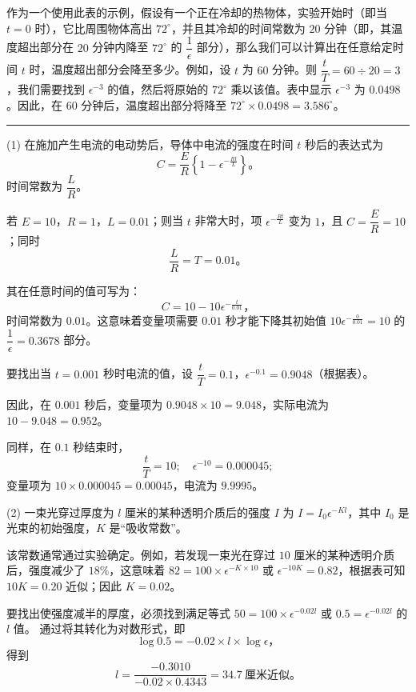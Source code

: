 \documentclass{ctexbook}
\newcommand\Subsection[1]{%
  \medskip\pagebreak[1]\par\textit{#1}\pagebreak[0]\par%
}
\newcommand{\Examples}[1]{%
  \ifthenelse{\equal{#1}{.}}{%
    \Subsection{\textit{例题}}%
  }{%
    \Subsection{\textit{#1}}%
  }
}
\newcommand{\DPPageSep}[2]{\Pagelabel{#2}}
\newcommand{\Pagelabel}[1]
  {\phantomsection\label{#1}}
\newcommand{\tb}[1][1.5in]{%
  \pagebreak[0]\par{\centering\rule{#1}{0.5pt}\pagebreak[3]\par}%
}
\newcommand{\DPtypo}[2]{#2}%
\newcommand{\DPchg}[2]{#2}%
\newcommand{\efrac}[2]{\frac{#1}{#2}}
\begin{document}
作为一个使用此表的示例，假设有一个正在冷却的热物体，实验开始时（即当 \( t = 0 \) 时），它比周围物体高出 \( 72^\circ \)，并且其冷却的时间常数为 \( 20 \) 分钟（即，其温度超出部分在 \( 20 \) 分钟内降至 \( 72^\circ \) 的 \( \dfrac{1}{\epsilon} \) 部分），那么我们可以计算出在任意给定时间 \( t \) 时，温度超出部分会降至多少。例如，设 \( t \) 为 \( 60 \) 分钟。则 \( \dfrac{t}{T} = 60 ÷ 20 = 3 \)，我们需要找到 \( \epsilon^{-3} \) 的值，然后将原始的 \( 72^\circ \) 乘以该值。表中显示 \( \epsilon^{-3} \) 为 \( 0.0498 \)。因此，在 \( 60 \) 分钟后，温度超出部分将降至 \( 72^\circ × 0.0498 = 3.586^\circ \)。

\tb

\clearpage%
\Examples{更多示例。}
(1) 在施加产生电流的电动势后，导体中电流的强度在时间 \( t \) 秒后的表达式为
\[
C = \dfrac{E}{R}\left\{1 - \epsilon^{-\efrac{Rt}{L}}\right\}。
\]
时间常数为 \( \dfrac{L}{R} \)。

若 \( E = 10 \)，\( R = 1 \)，\( L = 0.01 \)；则当 \( t \) 非常大时，项 \( \epsilon^{-\efrac{Rt}{L}} \) 变为 \( 1 \)，且 \( C = \dfrac{E}{R} = 10 \)；同时
\[
\frac{L}{R} = T = 0.01。
\]

其在任意时间的值可写为：
\[
C = 10 - 10\epsilon^{-\efrac{t}{0.01}}，
\]
时间常数为 \( 0.01 \)。这意味着变量项需要 \( 0.01 \) 秒才能下降其初始值 \( 10\epsilon^{-\efrac{0}{0.01}} = 10 \) 的 \( \dfrac{1}{\epsilon} = 0.3678 \) 部分。

要找出当 \( t = 0.001 \) 秒时电流的值，设 \( \dfrac{t}{T} = 0.1 \)，\( \epsilon^{-0.1} = 0.9048 \)（根据表）。

因此，在 \( 0.001 \) 秒后，变量项为 \( 0.9048 × 10 = 9.048 \)，实际电流为 \( 10 - 9.048 = 0.952 \)。

同样，在 \( 0.1 \) 秒结束时，
\[
\frac{t}{T} = 10;\quad \epsilon^{-10} = 0.000045;
\]
变量项为 \( 10 × 0.000045 = 0.00045 \)，电流为 \( 9.9995 \)。

(2) 一束光穿过厚度为 \( l \) 厘米的某种透明介质后的强度 \( I \) 为 \( I = I_0\epsilon^{-Kl} \)，其中 \( I_0 \) 是光束的初始强度，\( K \) 是“吸收常数”。

该常数通常通过实验确定。例如，若发现一束光在穿过 \( 10 \) 厘米的某种透明介质后，强度减少了 \( 18\% \)，这意味着 \( 82 = 100 × \epsilon^{-K×10} \) 或 \( \epsilon^{-10K} = 0.82 \)，根据表可知 \( 10K = 0.20 \) 近似；因此 \( K = 0.02 \)。

要找出使强度减半的厚度，必须找到满足等式 \( 50 = 100 × \epsilon^{-0.02l} \) 或 \( 0.5 = \epsilon^{-0.02l} \) 的 \( l \) 值。
\DPPageSep{174.png}{162}%
通过将其转化为对数形式，即
\[
\log 0.5 = -0.02 × l × \log \epsilon，
\]
得到
\[
l = \frac{\DPchg{\overset{-}{1}.6990}{-0.3010}}{-0.02 × 0.4343}
 = \DPtypo{34.5}{34.7}~\text{厘米近似}。
\]
\end{document}
